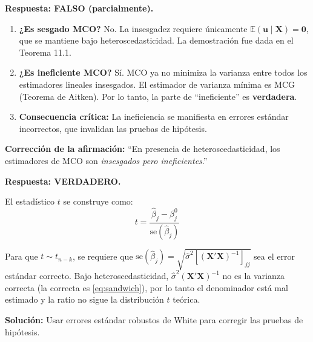 \documentclass[12pt,a4paper]{report}
\theoremstyle{definition}
\theoremstyle{remark}
\newcommand{\E}{\mathbb{E}}
\newcommand{\betahat}{\hat{\beta}}
\newcommand{\sigmahat}{\hat{\sigma}}
\begin{document}
\begin{tcolorbox}[ejerciciostyle, title={Ejercicio 11.1 (a): ``MCO es sesgado e ineficiente bajo heteroscedasticidad''}]
  \textbf{Respuesta: FALSO (parcialmente).}

  \begin{enumerate}[label=\alph*)]
    \item \textbf{¿Es sesgado MCO?} No. La insesgadez requiere únicamente $\E(\mathbf{u} \mid \mathbf{X}) = \mathbf{0}$, que se mantiene bajo heteroscedasticidad. La demostración fue dada en el Teorema 11.1.

    \item \textbf{¿Es ineficiente MCO?} Sí. MCO ya no minimiza la varianza entre todos los estimadores lineales insesgados. El estimador de varianza mínima es MCG (Teorema de Aitken). Por lo tanto, la parte de ``ineficiente'' es \textbf{verdadera}.

    \item \textbf{Consecuencia crítica:} La ineficiencia se manifiesta en errores estándar incorrectos, que invalidan las pruebas de hipótesis.
  \end{enumerate}

  \textbf{Corrección de la afirmación:} ``En presencia de heteroscedasticidad, los estimadores de MCO son \textit{insesgados pero ineficientes}.''
\end{tcolorbox}

\begin{tcolorbox}[ejerciciostyle, title={Ejercicio 11.1 (b): ``Las pruebas $t$ y $F$ son inválidas bajo heteroscedasticidad''}]
  \textbf{Respuesta: VERDADERO.}

  El estadístico $t$ se construye como:
  \begin{equation*}
    t = \frac{\betahat_j - \beta_j^0}{\text{se}(\betahat_j)}
  \end{equation*}

  Para que $t \sim t_{n-k}$, se requiere que $\text{se}(\betahat_j) = \sqrt{\sigmahat^2 [(\mathbf{X}'\mathbf{X})^{-1}]_{jj}}$ sea el error estándar correcto. Bajo heteroscedasticidad, $\sigmahat^2 (\mathbf{X}'\mathbf{X})^{-1}$ no es la varianza correcta (la correcta es \eqref{eq:sandwich}), por lo tanto el denominador está mal estimado y la ratio no sigue la distribución $t$ teórica.

  \textbf{Solución:} Usar errores estándar robustos de White para corregir las pruebas de hipótesis.
\end{tcolorbox}
\end{document}
